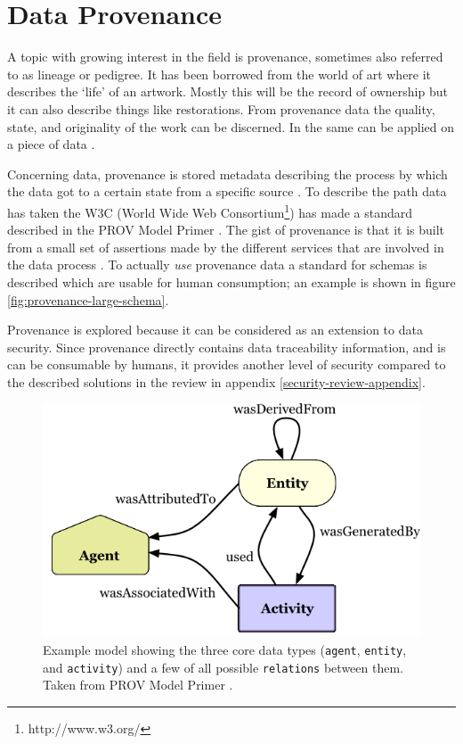 \newcommand{\agent}{{\tt agent}}
\newcommand{\entity}{{\tt entity}}
\newcommand{\activity}{{\tt activity}}
\newcommand{\relation}{{\tt relation}}
\newcommand{\relations}{{\tt relations}}
\newcommand{\attributes}{{\tt attributes}}

\section{Data Provenance}
\label{datamodel-provenance}

A topic with growing interest in the \escience{} field is provenance, sometimes also referred to as lineage or pedigree.
It has been borrowed from the world of art where it describes the `life' of an artwork.
Mostly this will be the record of ownership but it can also describe things like restorations.
From provenance data the quality, state, and originality of the work can be discerned.
In \escience{} the same can be applied on a piece of data \cite{dsp4moreau}.

Concerning data, provenance is stored metadata describing the process by which the data got to a certain state from a specific source \cite{dsp4moreau,dsp2buneman}.
To describe the path data has taken the W3C (World Wide Web Consortium\footnote{http://www.w3.org/}) has made a standard described in the PROV Model Primer \cite{dsp8gil}.
The gist of provenance is that it is built from a small set of assertions made by the different services that are involved in  the data process \cite{dsp4moreau}.
To actually \emph{use} provenance data a standard for schemas is described which are usable for human consumption; an example is shown in figure \ref{fig:provenance-large-schema}.

Provenance is explored because it can be considered as an extension to data security.
Since provenance directly contains data traceability information, and is can be consumable by humans, it provides another level of security compared to the described solutions in the review in appendix \ref{security-review-appendix}.

\begin{figure}
	\centering
	\includegraphics[width=0.5\linewidth]{images/provenance-overview}
	\caption{
		Example model showing the three core data types (\agent{}, \entity{}, and \activity{}) and a few of all possible \relations{} between them. 
		Taken from PROV Model Primer \cite{dsp8gil}.}
	\label{fig:provenance-overview}
\end{figure}

